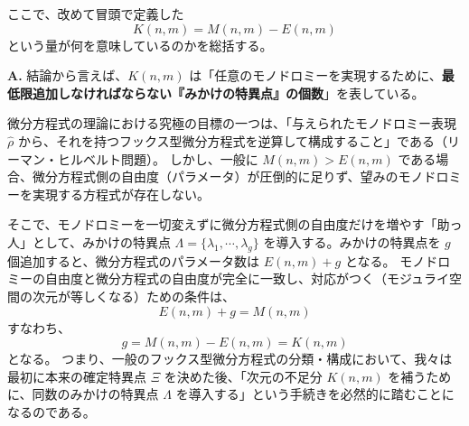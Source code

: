 ここで、改めて冒頭で定義した
\[
K(n,m)=M(n,m)-E(n,m)
\]
という量が何を意味しているのかを総括する。

\begin{Q}
\textbf{A.} 結論から言えば、$K(n,m)$ は「任意のモノドロミーを実現するために、\textbf{最低限追加しなければならない『みかけの特異点』の個数}」を表している。

微分方程式の理論における究極の目標の一つは、「与えられたモノドロミー表現 $\hat{\rho}$ から、それを持つフックス型微分方程式を逆算して構成すること」である（リーマン・ヒルベルト問題）。
しかし、一般に $M(n,m) > E(n,m)$ である場合、微分方程式側の自由度（パラメータ）が圧倒的に足りず、望みのモノドロミーを実現する方程式が存在しない。

そこで、モノドロミーを一切変えずに微分方程式側の自由度だけを増やす「助っ人」として、みかけの特異点 $\Lambda=\{\lambda_{1},\cdots,\lambda_{g}\}$ を導入する。みかけの特異点を $g$ 個追加すると、微分方程式のパラメータ数は $E(n,m) + g$ となる。
モノドロミーの自由度と微分方程式の自由度が完全に一致し、対応がつく（モジュライ空間の次元が等しくなる）ための条件は、
\[
E(n,m) + g = M(n,m)
\]
すなわち、
\[
g = M(n,m) - E(n,m) = K(n,m)
\]
となる。
つまり、一般のフックス型微分方程式の分類・構成において、我々は最初に本来の確定特異点 $\Xi$ を決めた後、「次元の不足分 $K(n,m)$ を補うために、同数のみかけの特異点 $\Lambda$ を導入する」という手続きを必然的に踏むことになるのである。
\end{Q}

